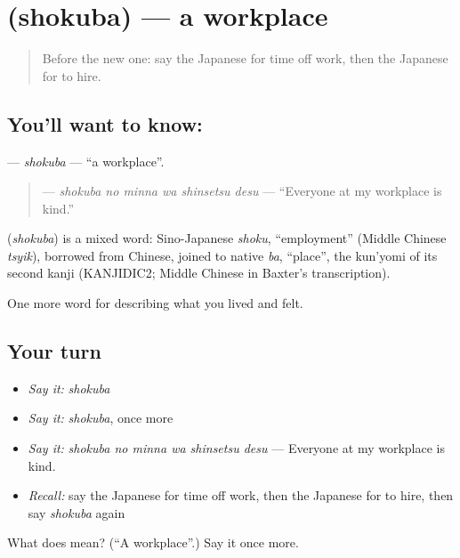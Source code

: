 \section[\texorpdfstring{\ja{しょくば} (shokuba)}{しょくば (shokuba)}]{ (shokuba) — a workplace}

\label{lesson:JA-C456-shokuba}



\begin{quote}
Before the new one: say the Japanese for time off work, then the Japanese for to hire.
\end{quote}

\subsection*{You'll want to know: }
\textbf{} — \emph{shokuba} — \textquotedblleft{}a workplace\textquotedblright{}.

\begin{quote}
\textbf{  } — \emph{shokuba no minna wa shinsetsu desu} — \textquotedblleft{}Everyone at my workplace is kind.\textquotedblright{}
\end{quote}

\begin{cousinweb}
\textbf{} (\emph{shokuba}) is a mixed word: Sino-Japanese \emph{shoku}, \textquotedblleft{}employment\textquotedblright{} (Middle Chinese \emph{tsyik}), borrowed from Chinese, joined to native \emph{ba}, \textquotedblleft{}place\textquotedblright{}, the kun'yomi of its second kanji (KANJIDIC2; Middle Chinese in Baxter's transcription).
\end{cousinweb}

\begin{grammarlens}[title={What you've built}]
One more word for describing what you lived and felt.
\end{grammarlens}

\subsection*{Your turn}
\begin{itemize}
\raggedright
  \item \emph{Say it:} \emph{shokuba}
  \item \emph{Say it:} \emph{shokuba}, once more
  \item \emph{Say it:} \emph{shokuba no minna wa shinsetsu desu} — Everyone at my workplace is kind.
  \item \emph{Recall:} say the Japanese for time off work, then the Japanese for to hire, then say \emph{shokuba} again
\end{itemize}

\begin{tcolorbox}[breakable,colback=teal!4,colframe=teal!35!black,title={Before you move on}]
What does  mean? (\textquotedblleft{}A workplace\textquotedblright{}.) Say it once more.
\end{tcolorbox}
